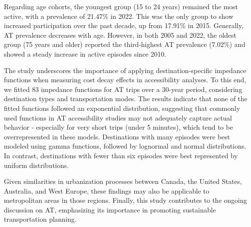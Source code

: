 \documentclass[preprint, 3p,
authoryear]{elsarticle} %
\begin{document}
Regarding age cohorts, the youngest group (15 to 24 years) remained the
most active, with a prevalence of 21.47\% in 2022. This was the only
group to show increased participation over the past decade, up from
17.91\% in 2015. Generally, AT prevalence decreases with age. However,
in both 2005 and 2022, the oldest group (75 years and older) reported
the third-highest AT prevalence (7.02\%) and showed a steady increase in
active episodes since 2010.

The study underscores the importance of applying destination-specific
impedance functions when measuring cost decay effects in accessibility
analyses. To this end, we fitted 83 impedance functions for AT trips
over a 30-year period, considering destination types and transportation
modes. The results indicate that none of the fitted functions followed
an exponential distribution, suggesting that commonly used functions in
AT accessibility studies may not adequately capture actual behavior -
especially for very short trips (under 5 minutes), which tend to be
overrepresented in these models. Destinations with many episodes were
best modeled using gamma functions, followed by lognormal and normal
distributions. In contrast, destinations with fewer than six episodes
were best represented by uniform distributions.

Given similarities in urbanization processes between Canada, the United
States, Australia, and West Europe, these findings may also be
applicable to metropolitan areas in those regions. Finally, this study
contributes to the ongoing discussion on AT, emphasizing its importance
in promoting sustainable transportation planning.

\renewcommand\refname{References}

\end{document}
